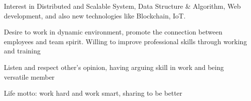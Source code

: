 \documentclass[letter,10pt]{article}
\begin{document}

\begin{zitemize}
\item Interest in Distributed and Scalable System, Data Structure \& Algorithm, Web development, and also new technologies like Blockchain, IoT. 
\item Desire to work in dynamic environment, promote the connection between employees and  team spirit. Willing to improve professional skills through working and training \\
\item Listen and respect other's opinion, having arguing skill in work and being versatile member \\
\item Life motto: work hard and work smart, sharing to be better \\
\end{zitemize}
\end{document}
